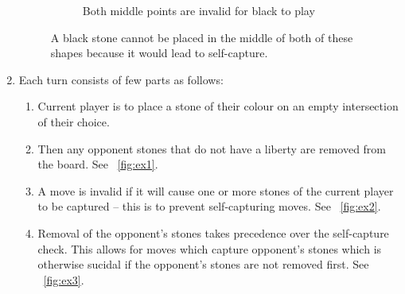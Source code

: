 \documentclass{l4proj}
\begin{document}
\begin{enumerate}
\begin{figure}[!ht]
\begin{subfigure}[t]{0.30\textwidth}
  \caption{Both middle points are invalid for black to play}
  \label{fig:ex2-1}
  \end{subfigure}
  \caption{A black stone cannot be placed in the middle of both of these shapes because it would lead to self-capture.}
  \label{fig:ex2}
  \end{figure}

  \item Each turn consists of few parts as follows:
  	\begin{enumerate}[label={(\alph*)}]
		\item Current player is to place a stone of their colour on an empty intersection of their choice.
		\item Then any opponent stones that do not have a liberty are removed from the board. See ~\autoref{fig:ex1}.
		\item A move is invalid if it will cause one or more stones of the current player to be captured – this is to prevent self-capturing moves. See ~\autoref{fig:ex2}.
		\item Removal of the opponent’s stones takes precedence over the self-capture check. This allows for moves which capture opponent’s stones which is otherwise sucidal if the opponent’s stones are not removed first. See ~\autoref{fig:ex3}.
	\end{enumerate}


\end{enumerate}
\end{document}
